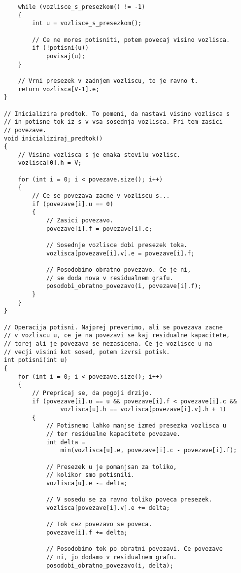 \documentclass[mat1]{fmfdelo}
\begin{document}
\begin{verbatim}
    while (vozlisce_s_presezkom() != -1)
    {
        int u = vozlisce_s_presezkom();
        
        // Ce ne mores potisniti, potem povecaj visino vozlisca.
        if (!potisni(u))
            povisaj(u);
    }
    
    // Vrni presezek v zadnjem vozliscu, to je ravno t.
    return vozlisca[V-1].e;
}

// Inicializira predtok. To pomeni, da nastavi visino vozlisca s
// in potisne tok iz s v vsa sosednja vozlisca. Pri tem zasici
// povezave.
void inicializiraj_predtok()
{
    // Visina vozlisca s je enaka stevilu vozlisc.
    vozlisca[0].h = V;
    
    for (int i = 0; i < povezave.size(); i++)
    {
        // Ce se povezava zacne v vozliscu s...
        if (povezave[i].u == 0)
        {
            // Zasici povezavo.
            povezave[i].f = povezave[i].c;
            
            // Sosednje vozlisce dobi presezek toka.
            vozlisca[povezave[i].v].e = povezave[i].f;
            
            // Posodobimo obratno povezavo. Ce je ni,
            // se doda nova v residualnem grafu.
            posodobi_obratno_povezavo(i, povezave[i].f);
        }
    }
}

// Operacija potisni. Najprej preverimo, ali se povezava zacne
// v vozliscu u, ce je na povezavi se kaj residualne kapacitete,
// torej ali je povezava se nezasicena. Ce je vozlisce u na
// vecji visini kot sosed, potem izvrsi potisk.
int potisni(int u)
{
    for (int i = 0; i < povezave.size(); i++)
    {
        // Prepricaj se, da pogoji drzijo.
        if (povezave[i].u == u && povezave[i].f < povezave[i].c &&
                vozlisca[u].h == vozlisca[povezave[i].v].h + 1)
        {
            // Potisnemo lahko manjse izmed presezka vozlisca u
            // ter residualne kapacitete povezave.
            int delta =
                min(vozlisca[u].e, povezave[i].c - povezave[i].f);
            
            // Presezek u je pomanjsan za toliko,
            // kolikor smo potisnili.
            vozlisca[u].e -= delta;
        
            // V sosedu se za ravno toliko poveca presezek.
            vozlisca[povezave[i].v].e += delta;
        
            // Tok cez povezavo se poveca.
            povezave[i].f += delta;
        
            // Posodobimo tok po obratni povezavi. Ce povezave
            // ni, jo dodamo v residualnem grafu.
            posodobi_obratno_povezavo(i, delta);
        

\end{verbatim}
\end{document}
